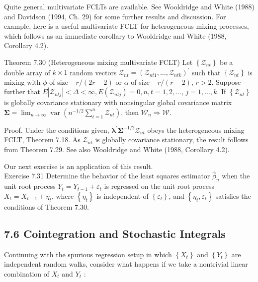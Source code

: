 \documentclass[10pt]{article}
\begin{document}
Quite general multivariate FCLTs are available. See Wooldridge and White (1988) and Davidson (1994, Ch. 29) for some further results and discussion. For example, here is a useful multivariate FCLT for heterogeneous mixing processes, which follows as an immediate corollary to Wooldridge and White (1988, Corollary 4.2).

Theorem 7.30 (Heterogeneous mixing multivariate FCLT) Let $\left\{\mathcal{Z}_{n t}\right\}$ be a double array of $k \times 1$ random vectors $\mathcal{Z}_{n t}=\left(\mathcal{Z}_{n t 1}, \ldots, \mathcal{Z}_{n t k}\right)^{\prime}$ such that $\left\{\mathcal{Z}_{n t}\right\}$ is mixing with $\phi$ of size $-r /(2 r-2)$ or $\alpha$ of size $-r /(r-2)$, $r>2$. Suppose further that $E\left|\mathcal{Z}_{n t j}\right|<\Delta<\infty, E\left(\mathcal{Z}_{n t j}\right)=0, n, t=1,2, \ldots$, $j=1, \ldots, k$. If $\left\{\mathcal{Z}_{n t}\right\}$ is globally covariance stationary with nonsingular global covariance matrix $\boldsymbol{\Sigma}=\lim _{n \rightarrow \infty} \operatorname{var}\left(n^{-1 / 2} \sum_{t=1}^{n} \boldsymbol{\mathcal { Z }}_{n t}\right)$, then $\boldsymbol{\mathcal { W }}_{n} \Rightarrow \mathcal{W}$.

Proof. Under the conditions given, $\boldsymbol{\lambda}^{\prime} \boldsymbol{\Sigma}^{-1 / 2} \boldsymbol{\mathcal { Z }}_{n t}$ obeys the heterogeneous mixing FCLT, Theorem 7.18. As $\mathcal{Z}_{n t}$ is globally covariance stationary, the result follows from Theorem 7.29. See also Wooldridge and White (1988, Corollary 4.2).

Our next exercise is an application of this result.\\
Exercise 7.31 Determine the behavior of the least squares estimator $\hat{\beta}_{n}$ when the unit root process $Y_{t}=Y_{t-1}+\varepsilon_{t}$ is regressed on the unit root process $X_{t}=X_{t-1}+\eta_{t}$, where $\left\{\eta_{t}\right\}$ is independent of $\left\{\varepsilon_{t}\right\}$, and $\left\{\eta_{t}, \varepsilon_{t}\right\}$ satisfies the conditions of Theorem 7.30.

\subsection*{7.6 Cointegration and Stochastic Integrals}
Continuing with the spurious regression setup in which $\left\{X_{t}\right\}$ and $\left\{Y_{t}\right\}$ are independent random walks, consider what happens if we take a nontrivial linear combination of $X_{t}$ and $Y_{t}$ :
\end{document}
